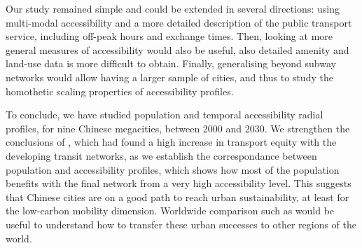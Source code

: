 \documentclass{article}
\begin{document}
Our study remained simple and could be extended in several directions: using multi-modal accessibility and a more detailed description of the public transport service, including off-peak hours and exchange times. Then, looking at more general measures of accessibility would also be useful, also detailed amenity and land-use data is more difficult to obtain. Finally, generalising beyond subway networks would allow having a larger sample of cities, and thus to study the homothetic scaling properties of accessibility profiles.

To conclude, we have studied population and temporal accessibility radial profiles, for nine Chinese megacities, between 2000 and 2030. We strengthen the conclusions of \cite{raimbault2018evolving}, which had found a high increase in transport equity with the developing transit networks, as we establish the correspondance between population and accessibility profiles, which shows how most of the population benefits with the final network from a very high accessibility level. This suggests that Chinese cities are on a good path to reach urban sustainability, at least for the low-carbon mobility dimension. Worldwide comparison such as \cite{wu2021urban} would be useful to understand how to transfer these urban successes to other regions of the world.




% 
%
%
\end{document}
